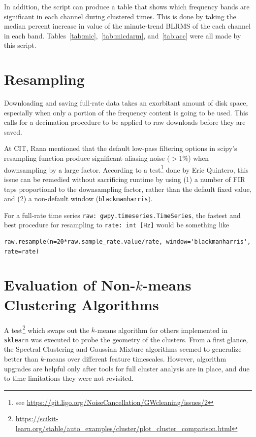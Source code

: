 \documentclass[colorlinks=true,pdfstartview=FitV,linkcolor=blue,
            citecolor=red,urlcolor=magenta]{ligodoc}
\begin{document}
In addition, the script can produce a table that shows which frequency bands are significant in each channel during clustered times.
This is done by taking the median percent increase in value of the minute-trend BLRMS of the each channel in each band.
Tables~\ref{tab:mic},~\ref{tab:micdarm}, and~\ref{tab:acc} were all made by this script.


\appendix
\appendixpage
\section{Resampling}
Downloading and saving full-rate data takes an exorbitant amount of disk space, especially when only a portion of the frequency content is going to be used.
This calls for a decimation procedure to be applied to raw downloads before they are saved.

At CIT, Rana mentioned that the default low-pass filtering options in scipy's resampling function produce significant aliasing noise ($>1$\%) when downsampling by a large factor.
According to a test\footnote{see \url{https://git.ligo.org/NoiseCancellation/GWcleaning/issues/2}} done by Eric Quintero, this issue can be remedied without sacrificing runtime by using (1) a number of FIR taps proportional to the downsampling factor, rather than the default fixed value, and (2) a non-default window (\texttt{blackmanharris}).


For a full-rate time series \texttt{raw: gwpy.timeseries.TimeSeries}, the fastest and best procedure for resampling to \texttt{rate: int [Hz]} would be something like
\begin{verbatim}
raw.resample(n=20*raw.sample_rate.value/rate, window='blackmanharris', rate=rate)
\end{verbatim}

\section{Evaluation of Non-$k$-means Clustering Algorithms}\label{app:algo}
A test\footnote{\url{https://scikit-learn.org/stable/auto_examples/cluster/plot_cluster_comparison.html}} which swaps out the $k$-means algorithm for others implemented in \texttt{sklearn} was executed to probe the geometry of the clusters.
From a first glance, the Spectral Clustering and Gaussian Mixture algorithms seemed to generalize better than $k$-means over different feature timescales.
However, algorithm upgrades are helpful only after tools for full cluster analysis are in place, and due to time limitations they were not revisited.


\end{document}
